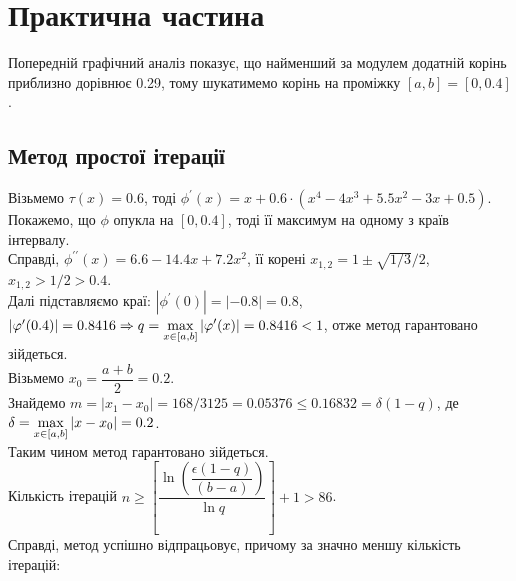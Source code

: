 \section{Практична частина}

Попередній графічний аналіз показує, що найменший за модулем додатній корінь приблизно дорівнює 0.29, тому шукатимемо корінь на проміжку $[a, b] = [0, 0.4]$.

\subsection{Метод простої ітерації}
Візьмемо $\tau(x) = 0.6$, тоді $\phi^\prime(x) = x + 0.6 \cdot (x^4 - 4 x^3 + 5.5 x^2 - 3x + 0.5)$. \\

Покажемо, що $\phi$ опукла на $[0, 0.4]$, тоді її максимум на одному з країв інтервалу. \\

Справді, $\phi^{\prime\prime}(x) = 6.6 - 14.4 x + 7.2 x^2$, її корені $x_{1,2} = 1 \pm \sqrt{1/3} / 2$, $x_{1, 2} > 1 / 2 > 0.4$. \\

Далі підставляємо краї: $|\phi^\prime(0)| = |-0.8| = 0.8$, $|\varphi^\prime(0.4)| = 0.8416 \Rightarrow q = \displaystyle\max\limits_{x\in[a,b]} |\varphi^\prime(x)| = 0.8416 < 1$, отже метод гарантовано зійдеться. \\

Візьмемо $x_0 = \dfrac{a + b}{2} = 0.2$. \\

Знайдемо $m = |x_1 - x_0| = 168/3125 = 0.05376 \le 0.16832 = \delta (1 - q)$, де $\delta = \displaystyle\max\limits_{x\in[a,b]}|x - x_0| = 0.2$. \\

Таким чином метод гарантовано зійдеться. \\

Кількість ітерацій $n \ge \left[ \dfrac{\ln \left(\dfrac{\epsilon(1-q)}{(b-a)}\right)}{\ln q} \right] + 1 > 86$. \\

Справді, метод успішно відпрацьовує, причому за значно меншу кількість ітерацій:
    
